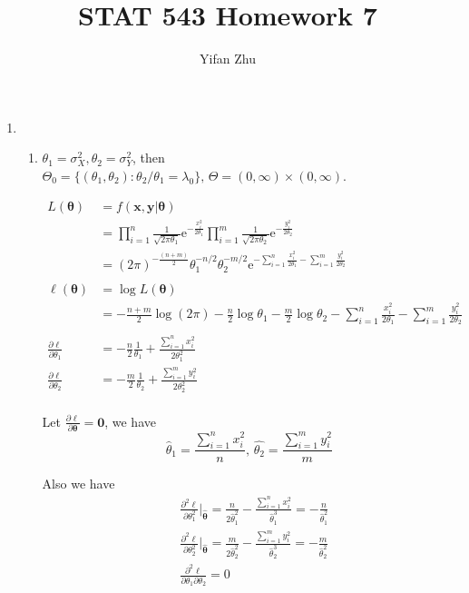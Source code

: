 \documentclass{article}
\begin{document}
\setcounter{MaxMatrixCols}{20}



\title{STAT 543 Homework 7}
\author{Yifan Zhu}
\maketitle

\begin{enumerate}[leftmargin = 0 em, label = \arabic*., font = \bfseries]
	\item
	\begin{enumerate}
		\item 
	$\theta_1 = \sigma_X^2, \theta_2 = \sigma_Y^2$, then $\Theta_0 = \{(\theta_1, \theta_2): \theta_2 / \theta_1 = \lambda_0\},\, \Theta = (0, \infty) \times (0, \infty)$.

	\begin{align*}
	L(\bm \theta) & = f(\bm x, \bm y | \bm \theta)\\
	& = \prod_{i=1}^n \frac{1}{\sqrt{2 \pi \theta_1}} \mathrm{e}^{-\frac{x_i^2}{2 \theta_1}} \prod_{i=1}^m \frac{1}{\sqrt{2 \pi \theta_2}} \mathrm{e}^{-\frac{y_i^2}{2 \theta_2}}\\
	& = (2 \pi)^{-\frac{(n+m)}{2}} \theta_1^{-n/2} \theta_2^{-m/2} \mathrm{e}^{-\sum_{i=1}^n \frac{x_i^2}{2 \theta_1} - \sum_{i=1}^m \frac{y_i^2}{2 \theta_2}}\\
	\\
	\ell (\bm \theta) &= \log L(\bm \theta) \\
	& = - \frac{n+m}{2} \log (2 \pi) - \frac{n}{2} \log \theta_1 - \frac{m}{2} \log \theta_2 - \sum_{i=1}^n \frac{x_i^2}{2 \theta_1} - \sum_{i=1}^m \frac{y_i^2}{2 \theta_2}\\
	\\
	\frac{\partial \ell}{\partial \theta_1} & = - \frac{n}{2} \frac{1}{\theta_1} + \frac{\sum_{i=1}^n x_i^2}{2 \theta_1^2}\\
	\frac{\partial \ell}{\partial \theta_2} & = - \frac{m}{2} \frac{1}{\theta_2} + \frac{\sum_{i=1}^m y_i^2}{2 \theta_2^2}\\
	\end{align*}

	Let $\frac{\partial \ell}{\partial \bm \theta} = \bm 0 $, we have
	\[\hat{\theta}_1 = \frac{\sum_{i=1}^n x_i^2}{n},\, \hat{\theta_2} = \frac{\sum_{i=1}^m y_i^2}{m}\]

	Also we have
	\begin{align*}
	&\frac{\partial^2 \ell}{\partial \theta_1^2} \bigg |_{\hat{\bm \theta}} = \frac{n}{2 \hat{\theta}_1^2} - \frac{\sum_{i=1}^n x_i^2}{\hat{\theta}_1^3} = - \frac{n}{\hat{\theta}_1^2}\\
	 &\frac{\partial^2 \ell}{\partial \theta_2^2} \bigg |_{\hat{\bm \theta}} = \frac{m}{2 \hat{\theta}_2^2} - \frac{\sum_{i=1}^m y_i^2}{\hat{\theta}_2^3} = - \frac{m}{\hat{\theta}_2^2}\\
	 &\frac{\partial^2 \ell}{\partial \theta_1 \partial \theta_2} = 0
	\end{align*}


\end{enumerate}
\end{enumerate}
\end{document}
